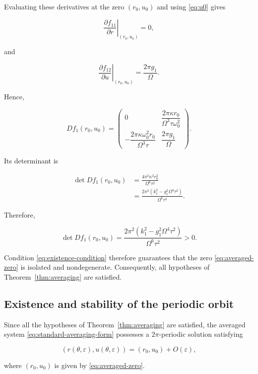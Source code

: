 \documentclass[11pt,reqno]{amsart}
\theoremstyle{plain}
\theoremstyle{definition}
\theoremstyle{remark}
\begin{document}
Evaluating these derivatives at the zero
$(r_0,u_0)$ and using
\eqref{eq:u0} gives

\[
\left.
\frac{\partial f_{11}}{\partial r}
\right|_{(r_0,u_0)}
=
0,
\]

and

\[
\left.
\frac{\partial f_{12}}{\partial u}
\right|_{(r_0,u_0)}
=
\frac{2\pi g_1}{\Omega}.
\]

Hence,

\begin{equation}
\label{eq:jacobian}
\boxed{
Df_1(r_0,u_0)
=
\begin{pmatrix}
0
&
\dfrac{2\pi\kappa r_0}
{\Omega^3\tau\omega_0^2}
\\[5mm]
-\dfrac{2\pi\kappa\omega_0^2r_0}
{\Omega^3\tau}
&
\dfrac{2\pi g_1}{\Omega}
\end{pmatrix}.
}
\end{equation}

Its determinant is

\begin{align}
\det Df_1(r_0,u_0)
&=
\frac{
4\pi^2\kappa^2r_0^2
}
{\Omega^6\tau^2}
\nonumber\\
&=
\frac{
2\pi^2
\left(
k_1^2-g_1^2\Omega^4\tau^2
\right)
}
{\Omega^6\tau^2}.
\end{align}

Therefore,

\begin{equation}
\label{eq:jacobian-determinant}
\boxed{
\det Df_1(r_0,u_0)
=
\frac{
2\pi^2
\left(
k_1^2-g_1^2\Omega^4\tau^2
\right)
}
{\Omega^6\tau^2}
>0.
}
\end{equation}

Condition \eqref{eq:existence-condition} therefore guarantees that the
zero \eqref{eq:averaged-zero} is isolated and nondegenerate.
Consequently, all hypotheses of
Theorem~\ref{thm:averaging} are satisfied.

\subsection{Existence and stability of the periodic orbit}

Since all the hypotheses of Theorem~\ref{thm:averaging} are satisfied,
the averaged system \eqref{eq:standard-averaging-form} possesses a
$2\pi$-periodic solution satisfying

\[
(r(\theta,\varepsilon),u(\theta,\varepsilon))
=
(r_0,u_0)+O(\varepsilon),
\]

where $(r_0,u_0)$ is given by
\eqref{eq:averaged-zero}.
\end{document}
